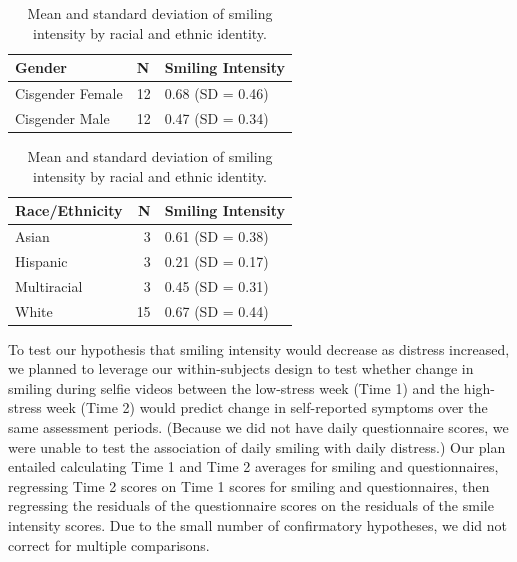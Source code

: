 \documentclass[authordate, empirical]{jote-new-article}
\begin{document}
\begin{table}[th!]
  \begin{fullwidth}

    \caption{Mean and standard deviation of smiling intensity by gender.}
    \begin{tabularx}{\linewidth}{@{} X l l @{}}
      \toprule
      \textbf{Gender}  & \textbf{N} & \textbf{Smiling Intensity} \\
      \midrule

      Cisgender Female & 12         & 0.68 (SD = 0.46)           \\

      Cisgender Male   & 12         & 0.47 (SD = 0.34)           \\
      \bottomrule
    \end{tabularx}


    \vspace*{2\baselineskip}
    \caption{Mean and standard deviation of smiling intensity by racial and ethnic identity.}
    \begin{tabularx}{\linewidth}{@{} X r l @{}}
      \toprule
      \textbf{Race/Ethnicity} & \textbf{N} & \textbf{Smiling Intensity} \\
      \midrule


      Asian                   & 3          & 0.61 (SD = 0.38)           \\

      Hispanic                & 3          & 0.21 (SD = 0.17)           \\

      Multiracial             & 3          & 0.45 (SD = 0.31)           \\

      White                   & 15         & 0.67 (SD = 0.44)           \\
      \bottomrule
    \end{tabularx}
  \end{fullwidth}
\end{table}


To test our hypothesis that smiling intensity would decrease as distress increased, we planned to leverage our within-subjects design to test whether change in smiling during selfie videos between the low-stress week (Time 1) and the high-stress week (Time 2) would predict change in self-reported symptoms over the same assessment periods. (Because we did not have daily questionnaire scores, we were unable to test the association of daily smiling with daily distress.) Our plan entailed calculating Time 1 and Time 2 averages for smiling and questionnaires, regressing Time 2 scores on Time 1 scores for smiling and questionnaires, then regressing the residuals of the questionnaire scores on the residuals of the smile intensity scores. Due to the small number of confirmatory hypotheses, we did not correct for multiple comparisons.
\end{document}
